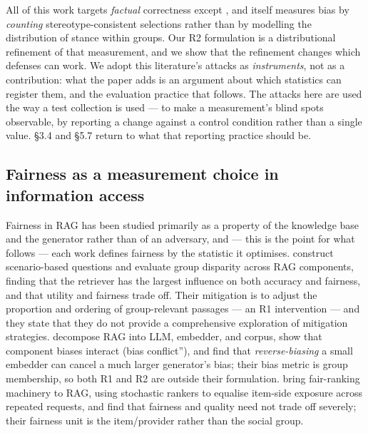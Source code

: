 \documentclass[authoryear,review,3p,times]{elsarticle}
\begin{document}
All of this work targets \emph{factual} correctness except \citeyearpar{wang2025}, and \citeyearpar{wang2025} itself measures bias by \emph{counting} stereotype-consistent selections rather than by modelling the distribution of stance within groups. Our R2 formulation is a distributional refinement of that measurement, and we show that the refinement changes which defenses can work. We adopt this literature's attacks as \emph{instruments}, not as a contribution: what the paper adds is an argument about which statistics can register them, and the evaluation practice that follows. The attacks here are used the way a test collection is used --- to make a measurement's blind spots observable, by reporting a change against a control condition rather than a single value. §3.4 and §5.7 return to what that reporting practice should be.

\subsection{Fairness as a measurement choice in information access}\label{fairness-as-a-measurement-choice-in-information-access}

Fairness in RAG has been studied primarily as a property of the knowledge base and the generator rather than of an adversary, and --- this is the point for what follows --- each work defines fairness by the statistic it optimises. \citet{wu2025} construct scenario-based questions and evaluate group disparity across RAG components, finding that the retriever has the largest influence on both accuracy and fairness, and that utility and fairness trade off. Their mitigation is to adjust the proportion and ordering of group-relevant passages --- an R1 intervention --- and they state that they do not provide a comprehensive exploration of mitigation strategies. \citet{kim2025a} decompose RAG into LLM, embedder, and corpus, show that component biases interact (\texttt{}bias conflict''), and find that \emph{reverse-biasing} a small embedder can cancel a much larger generator's bias; their bias metric is group membership, so both R1 and R2 are outside their formulation. \citet{kim2025b} bring fair-ranking machinery to RAG, using stochastic rankers to equalise item-side exposure across repeated requests, and find that fairness and quality need not trade off severely; their fairness unit is the item/provider rather than the social group.
\end{document}
